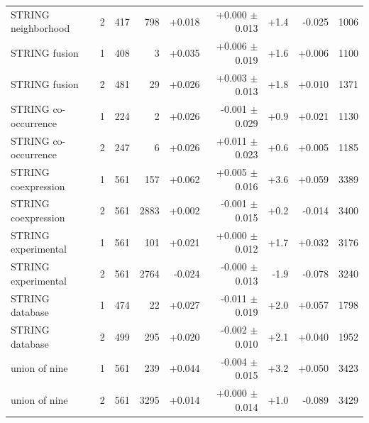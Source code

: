 \begin{table}[H]
\begin{tabular}{@{}lrrrrrrrr@{}}
    STRING neighborhood & 2 & 417 & 798 & +0.018 & +0.000 $\pm$ 0.013 & +1.4 & -0.025 & 1006 \\
    STRING fusion & 1 & 408 & 3 & +0.035 & +0.006 $\pm$ 0.019 & +1.6 & +0.006 & 1100 \\
    STRING fusion & 2 & 481 & 29 & +0.026 & +0.003 $\pm$ 0.013 & +1.8 & +0.010 & 1371 \\
    STRING co-occurrence & 1 & 224 & 2 & +0.026 & -0.001 $\pm$ 0.029 & +0.9 & +0.021 & 1130 \\
    STRING co-occurrence & 2 & 247 & 6 & +0.026 & +0.011 $\pm$ 0.023 & +0.6 & +0.005 & 1185 \\
    STRING coexpression & 1 & 561 & 157 & +0.062 & +0.005 $\pm$ 0.016 & +3.6 & +0.059 & 3389 \\
    STRING coexpression & 2 & 561 & 2883 & +0.002 & -0.001 $\pm$ 0.015 & +0.2 & -0.014 & 3400 \\
    STRING experimental & 1 & 561 & 101 & +0.021 & +0.000 $\pm$ 0.012 & +1.7 & +0.032 & 3176 \\
    STRING experimental & 2 & 561 & 2764 & -0.024 & -0.000 $\pm$ 0.013 & -1.9 & -0.078 & 3240 \\
    STRING database & 1 & 474 & 22 & +0.027 & -0.011 $\pm$ 0.019 & +2.0 & +0.057 & 1798 \\
    STRING database & 2 & 499 & 295 & +0.020 & -0.002 $\pm$ 0.010 & +2.1 & +0.040 & 1952 \\
    union of nine & 1 & 561 & 239 & +0.044 & -0.004 $\pm$ 0.015 & +3.2 & +0.050 & 3423 \\
    union of nine & 2 & 561 & 3295 & +0.014 & +0.000 $\pm$ 0.014 & +1.0 & -0.089 & 3429 \\
    \hline
  \end{tabular}
\end{table}
